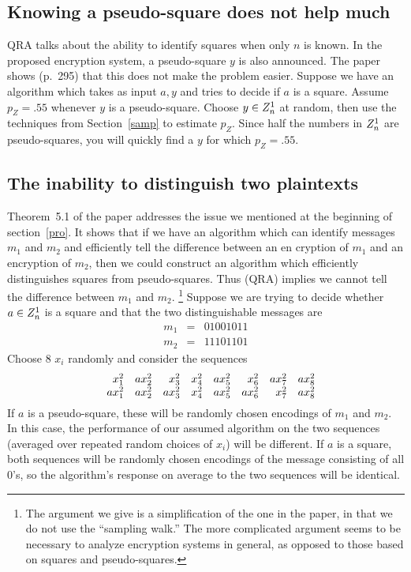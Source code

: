 \subsection{Knowing a pseudo-square does not help much}
QRA talks about the ability to identify squares when only $n$ is known.
In the proposed encryption system, a pseudo-square $y$ is also announced.
The paper shows (p.~295) that this does not make the problem easier.\pq
Suppose we have an algorithm which takes as input $a,y$ and tries to
decide if $a$ is a square. Assume $p_Z=.55$ whenever $y$ is a pseudo-square.
Choose $y\in Z^1_n$ at random, then use the techniques from Section~\ref{samp}
to estimate $p_Z$.  Since half the numbers in $Z^1_n$ are pseudo-squares,
you will quickly find a $y$ for which $p_Z=.55$.
\subsection{The inability to distinguish two plaintexts}
Theorem~5.1 of the paper addresses the issue we mentioned at the
beginning of section~\ref{pro}.  It shows that if we have an algorithm
which
can identify messages $m_1$ and $m_2$
and  efficiently tell the difference between an en%
cryption of $m_1$ and an encryption of $m_2$, then we could construct
an algorithm which efficiently distinguishes squares from pseudo-squares.
Thus (QRA) implies we cannot tell the difference between $m_1$
and $m_2$. \footnote{The argument we give is a
simplification of the one in the paper, in that we do not use the
``sampling walk.''  The more complicated argument seems to be necessary
to analyze encryption systems in general, as opposed to those based
on squares and pseudo-squares.} Suppose we are trying to decide
whether $a\in Z^1_n$
 is a square and that the two distinguishable
 messages are \begin{eqnarray*}m_1&=&01001011\\m_2&=&11101101 \end{eqnarray*}Choose
8 $x_i$ randomly and consider the sequences $$\vbox{\halign{&\hfil\quad$#$\cr
x_1^2&ax_2^2&x_3^2&x_4^2&ax_5^2&x_6^2 &ax_7^2&ax_8^2\cr ax_1^2&ax_2^2&ax_3^2&x_4^2&ax_5^2&ax_6^2&x_7^2&ax_8^2\cr}}$$
If $a$ is a pseudo-square, these will be randomly chosen encodings
of  $m_1$ and $m_2$.  In this case, the performance of our assumed
algorithm on the two sequences (averaged over repeated random choices
of $x_i$) will be different.  If $a$ is a square, both sequences
will be randomly chosen encodings of the message consisting of
all 0's, so the algorithm's response on average to the two sequences
will be identical.
